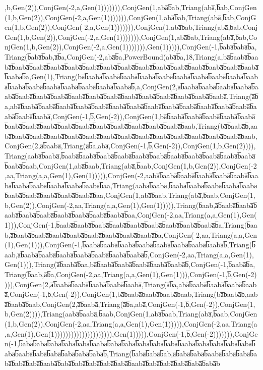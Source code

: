 ,b,Gen(2)),ConjGen(-2,a,Gen(1))))))),ConjGen(1,aba̅b̅ab,Triang(aba̅,b̅ab,ConjGen(1,b,Gen(2)),ConjGen(-2,a,Gen(1))))))),ConjGen(1,aba̅b̅ab,Triang(aba̅,b̅ab,ConjGen(1,b,Gen(2)),ConjGen(-2,a,Gen(1))))))),ConjGen(1,aba̅b̅ab,Triang(aba̅,b̅ab,ConjGen(1,b,Gen(2)),ConjGen(-2,a,Gen(1))))))),ConjGen(1,aba̅b̅ab,Triang(aba̅,b̅ab,ConjGen(1,b,Gen(2)),ConjGen(-2,a,Gen(1))))))),Gen(1))))),ConjGen(-1,b̅aba̅b̅aba̅b̅a,Triang(b̅aba̅b̅ab,a̅b̅a,ConjGen(-2,aba̅b̅a,PowerBound(aba̅b̅a,18,Triang(a,ba̅b̅aaba̅b̅aaba̅b̅aaba̅b̅aaba̅b̅aaba̅b̅aaba̅b̅aaba̅b̅aaba̅b̅aaba̅b̅aaba̅b̅aaba̅b̅aaba̅b̅aaba̅b̅aaba̅b̅aaba̅b̅aaba̅b̅aaba̅b̅a,Gen(1),Triang(ba̅b̅aaba̅b̅aaba̅b̅aaba̅b̅aaba̅b̅aaba̅b̅aaba̅b̅aaba̅b̅aaba̅b̅aaba̅b̅aaba̅b̅aaba̅b̅aaba̅b̅aaba̅b̅aaba̅b̅aaba̅b̅aaba̅b̅aaba̅b̅,a,ConjGen(2,a̅b̅aaba̅b̅aaba̅b̅aaba̅b̅aaba̅b̅aaba̅b̅aaba̅b̅aaba̅b̅aaba̅b̅aaba̅b̅aaba̅b̅aaba̅b̅aaba̅b̅aaba̅b̅aaba̅b̅aaba̅b̅aaba̅b̅aaba̅,Triang(a̅b̅a,aba̅b̅aaba̅b̅aaba̅b̅aaba̅b̅aaba̅b̅aaba̅b̅aaba̅b̅aaba̅b̅aaba̅b̅aaba̅b̅aaba̅b̅aaba̅b̅aaba̅b̅aaba̅b̅aaba̅b̅aaba̅b̅aaba̅,ConjGen(-1,b̅,Gen(-2)),ConjGen(1,ba̅b̅aaba̅b̅aaba̅b̅aaba̅b̅aaba̅b̅aaba̅b̅aaba̅b̅aaba̅b̅aaba̅b̅aaba̅b̅aaba̅b̅aaba̅b̅aaba̅b̅aaba̅b̅aaba̅b̅aaba̅b̅aab,Triang(ba̅b̅aaba̅b̅,aaba̅b̅aaba̅b̅aaba̅b̅aaba̅b̅aaba̅b̅aaba̅b̅aaba̅b̅aaba̅b̅aaba̅b̅aaba̅b̅aaba̅b̅aaba̅b̅aaba̅b̅aaba̅b̅aab,ConjGen(2,a̅b̅aaba̅,Triang(a̅b̅a,aba̅,ConjGen(-1,b̅,Gen(-2)),ConjGen(1,b,Gen(2)))),Triang(aaba̅b̅aaba̅,b̅aaba̅b̅aaba̅b̅aaba̅b̅aaba̅b̅aaba̅b̅aaba̅b̅aaba̅b̅aaba̅b̅aaba̅b̅aaba̅b̅aaba̅b̅aaba̅b̅aab,ConjGen(1,aba̅b̅aab,Triang(aba̅,b̅aab,ConjGen(1,b,Gen(2)),ConjGen(-2,aa,Triang(a,a,Gen(1),Gen(1))))),ConjGen(-2,aaba̅b̅aaba̅b̅aaba̅b̅aaba̅b̅aaba̅b̅aaba̅b̅aaba̅b̅aaba̅b̅aaba̅b̅aaba̅b̅aaba̅b̅aaba̅b̅aa,Triang(aaba̅b̅aaba̅,b̅aaba̅b̅aaba̅b̅aaba̅b̅aaba̅b̅aaba̅b̅aaba̅b̅aaba̅b̅aaba̅b̅aaba̅b̅aaba̅b̅aa,ConjGen(1,aba̅b̅aab,Triang(aba̅,b̅aab,ConjGen(1,b,Gen(2)),ConjGen(-2,aa,Triang(a,a,Gen(1),Gen(1))))),Triang(b̅aab,a̅b̅aaba̅b̅aaba̅b̅aaba̅b̅aaba̅b̅aaba̅b̅aaba̅b̅aaba̅b̅aaba̅b̅aaba̅b̅aa,ConjGen(-2,aa,Triang(a,a,Gen(1),Gen(1))),ConjGen(-1,b̅aaba̅b̅aaba̅b̅aaba̅b̅aaba̅b̅aaba̅b̅aaba̅b̅aaba̅b̅aaba̅b̅aaba̅b̅a,Triang(b̅aab,a̅b̅aaba̅b̅aaba̅b̅aaba̅b̅aaba̅b̅aaba̅b̅aaba̅b̅aaba̅b̅aaba̅b̅a,ConjGen(-2,aa,Triang(a,a,Gen(1),Gen(1))),ConjGen(-1,b̅aaba̅b̅aaba̅b̅aaba̅b̅aaba̅b̅aaba̅b̅aaba̅b̅aaba̅b̅aaba̅b̅,Triang(b̅aab,a̅b̅aaba̅b̅aaba̅b̅aaba̅b̅aaba̅b̅aaba̅b̅aaba̅b̅aaba̅b̅,ConjGen(-2,aa,Triang(a,a,Gen(1),Gen(1))),Triang(a̅b̅aaba̅b̅aa,ba̅b̅aaba̅b̅aaba̅b̅aaba̅b̅aaba̅b̅aaba̅b̅,ConjGen(-1,b̅aaba̅b̅a,Triang(b̅aab,a̅b̅a,ConjGen(-2,aa,Triang(a,a,Gen(1),Gen(1))),ConjGen(-1,b̅,Gen(-2)))),ConjGen(2,a̅b̅aaba̅b̅aaba̅b̅aaba̅b̅aaba̅b̅aaba̅,Triang(a̅b̅a,aba̅b̅aaba̅b̅aaba̅b̅aaba̅b̅aaba̅,ConjGen(-1,b̅,Gen(-2)),ConjGen(1,ba̅b̅aaba̅b̅aaba̅b̅aaba̅b̅aab,Triang(ba̅b̅aaba̅b̅,aaba̅b̅aaba̅b̅aab,ConjGen(2,a̅b̅aaba̅,Triang(a̅b̅a,aba̅,ConjGen(-1,b̅,Gen(-2)),ConjGen(1,b,Gen(2)))),Triang(aaba̅b̅aaba̅,b̅aab,ConjGen(1,aba̅b̅aab,Triang(aba̅,b̅aab,ConjGen(1,b,Gen(2)),ConjGen(-2,aa,Triang(a,a,Gen(1),Gen(1))))),ConjGen(-2,aa,Triang(a,a,Gen(1),Gen(1))))))))))))))))))))),Gen(1))))),ConjGen(-1,b̅,Gen(-2))))))),ConjGen(-1,b̅aba̅b̅aba̅b̅aba̅b̅aba̅b̅aba̅b̅aaba̅b̅aba̅b̅aba̅b̅aba̅b̅aba̅b̅aba̅b̅aaba̅b̅aba̅b̅aba̅b̅aba̅b̅aba̅b̅aba̅b̅aaba̅b̅aba̅b̅aba̅b̅aba̅b̅aba̅b̅aba̅b̅,Triang(b̅aba̅b̅aba̅b̅ab,a̅b̅aba̅b̅aba̅b̅aaba̅b̅aba̅b̅aba̅b̅aba̅b̅aba̅b̅aba̅b̅aaba̅b̅aba̅b̅aba̅b̅aba̅b̅aba̅b̅aba̅b̅aaba̅b̅aba̅b̅aba̅b̅aba̅b̅aba̅b̅aba̅b